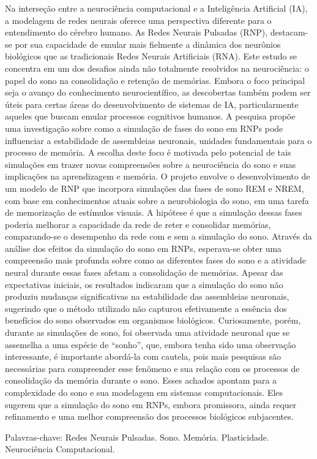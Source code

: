 \begin{resumo}
\noindent
 
Na interseção entre a neurociência computacional e a Inteligência Artificial (IA), a modelagem de redes neurais oferece uma
perspectiva diferente para o entendimento do cérebro humano. As Redes Neurais Pulsadas (RNP), destacam-se por sua capacidade de
emular mais fielmente a dinâmica dos neurônios biológicos que as tradicionais Redes Neurais Artificiais (RNA). Este estudo se
concentra em um dos desafios ainda não totalmente resolvidos na neurociência: o papel do sono na consolidação e retenção de
memórias. Embora o foco principal seja o avanço do conhecimento neurocientífico, as descobertas também podem ser úteis para certas
áreas do desenvolvimento de sistemas de IA, particularmente aqueles que buscam emular processos cognitivos humanos. A pesquisa
propõe uma investigação sobre como a simulação de fases do sono em RNPs pode influenciar a estabilidade de assembleias neuronais,
unidades fundamentais para o processo de memória. A escolha deste foco é motivada pelo potencial de tais simulações em trazer
novas compreensões sobre a neurociência do sono e suas implicações na aprendizagem e memória. O projeto envolve o desenvolvimento
de um modelo de RNP que incorpora simulações das fases de sono REM e NREM, com base em conhecimentos atuais sobre a neurobiologia
do sono, em uma tarefa de memorização de estímulos visuais. A hipótese é que a simulação dessas fases poderia melhorar a
capacidade da rede de reter e consolidar memórias, comparando-se o desempenho da rede com e sem a simulação do sono. Através da
análise dos efeitos da simulação do sono em RNPs, esperava-se obter uma compreensão mais profunda sobre como as diferentes fases
do sono e a atividade neural durante essas fases afetam a consolidação de memórias. Apesar das expectativas iniciais, os
resultados indicaram que a simulação do sono não produziu mudanças significativas na estabilidade das assembleias neuronais,
sugerindo que o método utilizado não capturou efetivamente a essência dos benefícios do sono observados em organismos biológicos.
Curiosamente, porém, durante as simulações de sono, foi observada uma atividade neuronal que se assemelha a uma espécie de
``sonho'', que, embora tenha sido uma observação interessante, é importante abordá-la com cautela, pois mais pesquisas são
necessárias para compreender esse fenômeno e sua relação com os processos de consolidação da memória durante o sono. Esses achados
apontam para a complexidade do sono e sua modelagem em sistemas computacionais. Eles sugerem que a simulação do sono em RNPs,
embora promissora, ainda requer refinamento e uma melhor compreensão dos processos biológicos subjacentes. 


\vspace{0.2cm}   
Palavras-chave: Redes Neurais Pulsadas. Sono. Memória. Plasticidade. Neurociência Computacional. 
\end{resumo}
 
